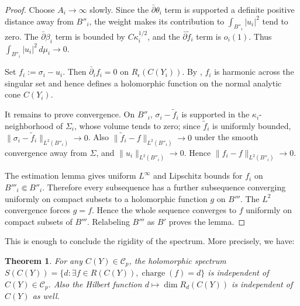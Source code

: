 \documentclass[11pt]{amsart}
\newtheorem{theorem}{Theorem}[section]
\theoremstyle{definition}
\theoremstyle{remark}
\begin{document}
\begin{proof}
Choose $A_i\to\infty$ slowly. Since the $\bar\partial\theta_i$ term is supported a definite positive distance away from $B''_i$, the weight makes its contribution to $\int_{B''_i}|u_i|^2$ tend to zero. The $\bar\partial\beta_i$ term is bounded by $C\kappa_i^{1/2}$, and the $\bar\partial\tilde f_i$ term is $o_i(1)$. Thus $\int_{B''_i}|u_i|^2\,d\mu_i\to0$.

Set $f_i:=\sigma_i-u_i$. Then $\bar\partial_i f_i=0$ on $R_\epsilon(C(Y_i))$. By \cite[Proposition 10]{SLII}, $f_i$ is harmonic across the singular set and hence defines a holomorphic function on the normal analytic cone $C(Y_i)$.

It remains to prove convergence. On $B''_i$, $\sigma_i-\tilde f_i$ is supported in the $\kappa_i$-neighborhood of $\Sigma_i$, whose volume tends to zero; since $\tilde f_i$ is uniformly bounded, $\|\sigma_i-\tilde f_i\|_{L^2(B''_i)}\to0$. Also $\|\tilde f_i-f\|_{L^2(B''_i)}\to0$ under the smooth convergence away from $\Sigma$, and $\|u_i\|_{L^2(B''_i)}\to0$. Hence $\|f_i-f\|_{L^2(B''_i)}\to0$.

The estimation lemma gives uniform $L^\infty$ and Lipschitz bounds for $f_i$ on $B'''_i\Subset B''_i$. Therefore every subsequence has a further subsequence converging uniformly on compact subsets to a holomorphic function $g$ on $B'''$. The $L^2$ convergence forces $g=f$. Hence the whole sequence converges to $f$ uniformly on compact subsets of $B'''$. Relabeling $B'''$ as $B'$ proves the lemma.
\end{proof}

This is enough to conclude the rigidity of the spectrum. More precisely, we have:

\begin{theorem}
For any $C(Y) \in \mathcal C_p$, the holomorphic spectrum
$S(C(Y)) = \{ d: \exists f \in R(C(Y)), \operatorname{charge}(f)=d \}$
is independent of $C(Y) \in \mathcal C_p$. Also the Hilbert function
$d \mapsto \dim R_d(C(Y))$ is independent of $C(Y)$ as well.
\end{theorem}
\end{document}
